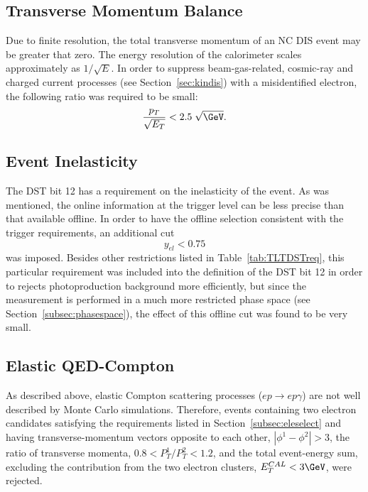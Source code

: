 \subsection{Transverse Momentum Balance}
\label{subsec:empzcut}
Due to finite resolution, the total transverse momentum of an NC DIS event may be greater that zero. The energy resolution of the calorimeter scales approximately as $1/\sqrt{E}$. In order to suppress beam-gas-related, cosmic-ray and charged current processes (see Section~\ref{sec:kindis}) with a misidentified electron, the following ratio was required to be small:
\begin{equation}
\frac{p_T}{\sqrt{E_T}} < 2.5\;\sqrt{\GeV}.
\label{eq:ptcut}
\end{equation}

\subsection{Event Inelasticity}
\label{subsec:yelcut}

The DST bit 12 has a requirement on the inelasticity of the event. As was mentioned, the online information at the trigger level can be less precise than that available offline. In order to have the offline selection consistent with the trigger requirements, an additional cut 
\begin{equation}
y_{el} < 0.75
\label{eq:yelcut}
\end{equation}
was imposed. Besides other restrictions listed in Table~\ref{tab:TLTDSTreq}, this particular requirement was included into the definition of the DST bit 12 in order to rejects photoproduction background more efficiently, but since the measurement is performed in a much more restricted phase space (see Section~\ref{subsec:phasespace}), the effect of this offline cut was found to be very small.

\subsection{Elastic QED-Compton}
\label{subsec:elasticqedcut}
As described above, elastic Compton scattering processes ($ep \rightarrow ep\gamma$) are not well described by Monte Carlo simulations. Therefore, events containing two electron candidates satisfying the requirements listed in Section~\ref{subsec:eleselect} and having transverse-momentum vectors opposite to each other, $\left|\phi^1 - \phi^2\right| > 3$, the ratio of transverse momenta, $0.8 < P_{T}^1/P_T^{2} < 1.2$, and the total event-energy sum, excluding the contribution from the two electron clusters, $E_T^{CAL} < 3 \GeV$, were rejected.


